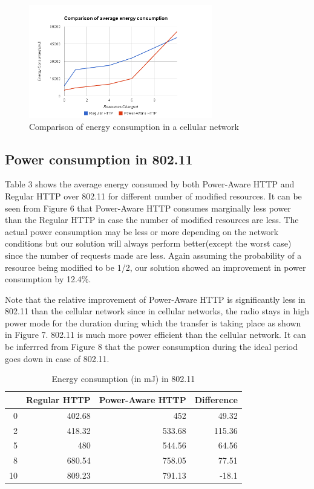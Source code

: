 \documentclass{sigplanconf}
\begin{document}
\begin{figure}[ht!]
\centering
\includegraphics[width=80mm]{avg_energy_cell.png}
\caption{Comparison of energy consumption in a cellular network}
\label{fig:sp_gd_mnist}
\end{figure}

\subsection{Power consumption in 802.11}
Table 3 shows the average energy consumed by both Power-Aware HTTP and Regular HTTP over 802.11 for different number of modified resources. It can be seen from Figure 6 that Power-Aware HTTP consumes marginally less power than the Regular HTTP in case the number of modified resources are less. The actual power consumption may be less or more depending on the network conditions but our solution will always perform better(except the worst case) since the number of requests made are less. Again assuming the probability of a resource being modified to be 1/2, our solution showed an improvement in power consumption by 12.4\%.

Note that the relative improvement of Power-Aware HTTP is significantly less in 802.11 than the cellular network since in cellular networks, the radio stays in high power mode for the duration during which the transfer is taking place as shown in Figure 7. 802.11 is much more power efficient than the cellular network. It can be inferrred from Figure 8 that the power consumption during the ideal period goes down in case of 802.11.

\begin{table}[htbp]
\centering
\caption{Energy consumption (in mJ) in 802.11}
\begin{tabular}{|r|r|r|r|}
\hline
\multicolumn{1}{|l|}{} & \multicolumn{1}{l|}{Regular HTTP} & \multicolumn{1}{l|}{Power-Aware HTTP} & \multicolumn{1}{l|}{Difference} \\ \hline
0 & 402.68 & 452 & 49.32 \\ \hline
2 & 418.32 & 533.68 & 115.36 \\ \hline
5 & 480 & 544.56 & 64.56 \\ \hline
8 & 680.54 & 758.05 & 77.51 \\ \hline
10 & 809.23 & 791.13 & -18.1 \\ \hline
\end{tabular}
\label{}
\end{table}
\end{document}
